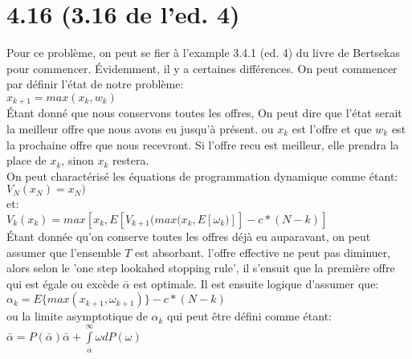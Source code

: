 \documentclass[oneside]{book}
\begin{document}
\section*{4.16 (3.16 de l'ed. 4)}
Pour ce problème, on peut se fier à l'example 3.4.1 (ed. 4) du livre de Bertsekas pour commencer. Évidemment, il y a certaines différences. On peut commencer par définir l'état de notre problème:\\

$x_{k+1} = max(x_k, w_k)$\\

Étant donné que nous conservons toutes les offres, On peut dire que l'état serait la meilleur offre que nous avons eu jusqu'à présent. ou $x_k$ est l'offre et que $w_k$ est la prochaine offre que nous recevront. Si l'offre recu est meilleur, elle prendra la place de $x_k$, sinon $x_k$ restera.\\

On peut charactérisé les équations de programmation dynamique comme étant:\\

$V_N(x_N) = x_N)$\\

et:\\

$V_k(x_k) = max[x_k ,E[V_{k+1}(max(x_k,E[\omega_k)]] - c*(N-k) ]$\\

Étant donnée qu'on conserve toutes les offres déjà eu auparavant, on peut assumer que l'ensemble $T$ est absorbant. l'offre effective ne peut pas diminuer, alors selon le 'one step lookahed stopping rule', il s'ensuit que la première offre qui est égale ou excède $\bar{\alpha}$ est optimale. Il est ensuite logique d'assumer que:\\

$\alpha_k = E\{max(x_{k+1},\omega_{k+1})\} - c*(N-k)$\\

ou la limite asymptotique de $\alpha_k$ qui peut être défini comme étant:\\

$\bar{\alpha} = P(\bar{\alpha})\bar{\alpha} + \int\limits_{\bar{\alpha}}^{\infty}\omega dP(\omega)$
\end{document}
